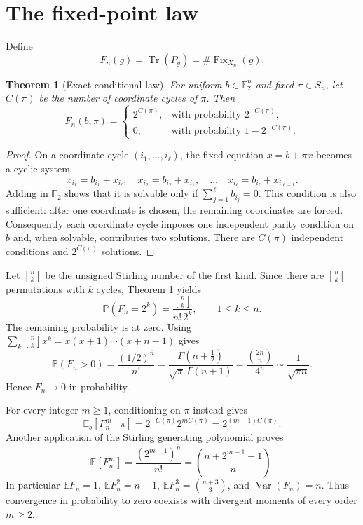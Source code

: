 \documentclass[11pt]{article}
\newtheorem{theorem}{Theorem}
\newcommand{\F}{\mathbb F}
\newcommand{\E}{\mathbb E}
\newcommand{\Prob}{\mathbb P}
\newcommand{\Fix}{\operatorname{Fix}}
\newcommand{\Tr}{\operatorname{Tr}}
\newcommand{\stirling}[2]{\genfrac{[}{]}{0pt}{}{#1}{#2}}
\begin{document}
\section{The fixed-point law}
Define
\[
F_n(g)=\Tr(P_g)=\#\Fix_{X_n}(g).
\]

\begin{theorem}[Exact conditional law]\label{thm:fixed-law}
For uniform $b\in\F_2^n$ and fixed $\pi\in S_n$, let $C(\pi)$ be the number
of coordinate cycles of $\pi$.  Then
\[
F_n(b,\pi)=
\begin{cases}
2^{C(\pi)},&\text{with probability }2^{-C(\pi)},\\
0,&\text{with probability }1-2^{-C(\pi)}.
\end{cases}
\]
\end{theorem}

\begin{proof}
On a coordinate cycle $(i_1,\ldots,i_\ell)$, the fixed equation
$x=b+\pi x$ becomes a cyclic system
\[
x_{i_1}=b_{i_1}+x_{i_\ell},\quad
x_{i_2}=b_{i_2}+x_{i_1},\quad\ldots\quad
x_{i_\ell}=b_{i_\ell}+x_{i_{\ell-1}}.
\]
Adding in $\F_2$ shows that it is solvable only if
$\sum_{j=1}^{\ell}b_{i_j}=0$.  This condition is also sufficient: after one
coordinate is chosen, the remaining coordinates are forced.  Consequently
each coordinate cycle imposes one independent parity condition on $b$ and,
when solvable, contributes two solutions.  There are $C(\pi)$ independent
conditions and $2^{C(\pi)}$ solutions.
\end{proof}

Let $\stirling{n}{k}$ be the unsigned Stirling number of the first kind.  Since
there are $\stirling{n}{k}$ permutations with $k$ cycles, Theorem
\ref{thm:fixed-law} yields
\begin{equation}\label{eq:distribution}
\Prob(F_n=2^k)=\frac{\stirling{n}{k}}{n!\,2^k},
\qquad 1\leq k\leq n.
\end{equation}
The remaining probability is at zero.  Using
$\sum_k\stirling{n}{k}x^k=x(x+1)\cdots(x+n-1)$ gives
\begin{equation}\label{eq:positive-probability}
\Prob(F_n>0)
=\frac{(1/2)^{\overline n}}{n!}
=\frac{\Gamma(n+\tfrac12)}{\sqrt\pi\,\Gamma(n+1)}
=\frac{\binom{2n}{n}}{4^n}
\sim\frac1{\sqrt{\pi n}}.
\end{equation}
Hence $F_n\to0$ in probability.

For every integer $m\geq1$, conditioning on $\pi$ instead gives
\[
\E_b[F_n^m\mid\pi]
=2^{-C(\pi)}2^{mC(\pi)}=2^{(m-1)C(\pi)}.
\]
Another application of the Stirling generating polynomial proves
\begin{equation}\label{eq:moments}
\boxed{\quad
\E[F_n^m]
=\frac{(2^{m-1})^{\overline n}}{n!}
=\binom{n+2^{m-1}-1}{n}.
\quad}
\end{equation}
In particular $\E F_n=1$, $\E F_n^2=n+1$,
$\E F_n^3=\binom{n+3}{3}$, and $\operatorname{Var}(F_n)=n$.  Thus convergence
in probability to zero coexists with divergent moments of every order
$m\geq2$.
\end{document}
